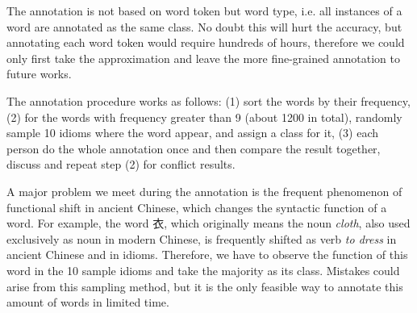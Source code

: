 The annotation is not based on word token but word type, i.e. all instances of a word are annotated as the same class. No doubt this will hurt the accuracy, but annotating each word token would require hundreds of hours, therefore we could only first take the approximation and leave the more fine-grained annotation to future works.

The annotation procedure works as follows: (1) sort the words by their frequency, (2) for the words with frequency greater than 9 (about 1200 in total), randomly sample 10 idioms where the word appear, and assign a class for it, (3) each person do the whole annotation once and then compare the result together, discuss and repeat step (2) for conflict results.


A major problem we meet during the annotation is the frequent phenomenon of functional shift in ancient Chinese, which changes the syntactic function of a word. For example, the word 衣, which originally means the noun {\em cloth}, also used exclusively as noun in modern Chinese, is frequently shifted as verb {\em to dress} in ancient Chinese and in idioms. Therefore, we have to observe the function of this word in the 10 sample idioms and take the majority as its class. Mistakes could arise from this sampling method, but it is the only feasible way to annotate this amount of words in limited time.
